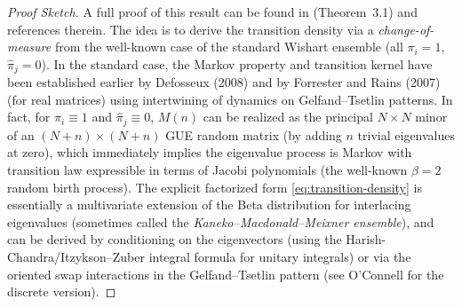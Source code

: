 \documentclass[letterpaper,11pt,oneside,reqno]{article}
\numberwithin{equation}{section}
\theoremstyle{definition}
\begin{document}
\begin{proof}[Proof Sketch]
A full proof of this result can be found in \cite{diekerWarren2008determinantal} (Theorem~3.1) and references therein. The idea is to derive the transition density via a \emph{change-of-measure} from the well-known case of the standard Wishart ensemble (all $\pi_i=1$, $\hat\pi_j=0$). In the standard case, the Markov property and transition kernel have been established earlier by Defosseux (2008) and by Forrester and Rains (2007) \cite{ForresterRains2007} (for real matrices) using intertwining of dynamics on Gelfand--Tsetlin patterns. In fact, for $\pi_i\equiv1$ and $\hat\pi_j\equiv0$, $M(n)$ can be realized as the principal $N\times N$ minor of an $(N+n)\times(N+n)$ GUE random matrix (by adding $n$ trivial eigenvalues at zero), which immediately implies the eigenvalue process is Markov with transition law expressible in terms of Jacobi polynomials (the well-known $\beta=2$ random birth process). The explicit factorized form \eqref{eq:transition-density} is essentially a multivariate extension of the Beta distribution for interlacing eigenvalues (sometimes called the \emph{Kaneko--Macdonald--Meixner ensemble}), and can be derived by conditioning on the eigenvectors (using the Harish-Chandra/Itzykson--Zuber integral formula for unitary integrals) or via the oriented swap interactions in the Gelfand--Tsetlin pattern (see O'Connell \cite{OConnell2003} for the discrete version).


\end{proof}
\end{document}
